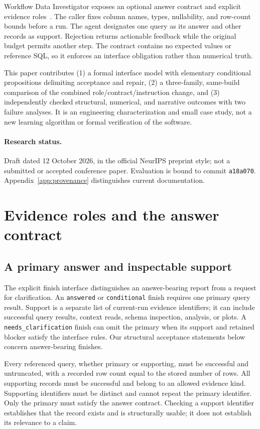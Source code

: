 \documentclass{article}
\newcommand{\code}[1]{\texttt{#1}}
\newcommand{\evalcommit}{\code{a18a070}}
\begin{document}
Workflow Data Investigator exposes an optional answer contract and explicit evidence roles~\citep{wdidocs}. The caller fixes column names, types, nullability, and row-count bounds before a run. The agent designates one query as its answer and other records as support. Rejection returns actionable feedback while the original budget permits another step. The contract contains no expected values or reference SQL, so it enforces an interface obligation rather than numerical truth.

This paper contributes (1) a formal interface model with elementary conditional propositions delimiting acceptance and repair, (2) a three-family, same-build comparison of the combined role/contract/instruction change, and (3) independently checked structural, numerical, and narrative outcomes with two failure analyses. It is an engineering characterization and small case study, not a new learning algorithm or formal verification of the software.

\paragraph{Research status.} Draft dated 12 October 2026, in the official NeurIPS preprint style; not a submitted or accepted conference paper. Evaluation is bound to commit \evalcommit. Appendix~\ref{app:provenance} distinguishes current documentation.

\section{Evidence roles and the answer contract}
\label{sec:method}
\subsection{A primary answer and inspectable support}
The explicit finish interface distinguishes an answer-bearing report from a request for clarification. An \code{answered} or \code{conditional} finish requires one primary query result. Support is a separate list of current-run evidence identifiers; it can include successful query results, context reads, schema inspection, analysis, or plots. A \code{needs\_clarification} finish can omit the primary when its support and retained blocker satisfy the interface rules. Our structural acceptance statements below concern answer-bearing finishes.

Every referenced query, whether primary or supporting, must be successful and untruncated, with a recorded row count equal to the stored number of rows. All supporting records must be successful and belong to an allowed evidence kind. Supporting identifiers must be distinct and cannot repeat the primary identifier. Only the primary must satisfy the answer contract. Checking a support identifier establishes that the record exists and is structurally usable; it does not establish its relevance to a claim.
\end{document}
